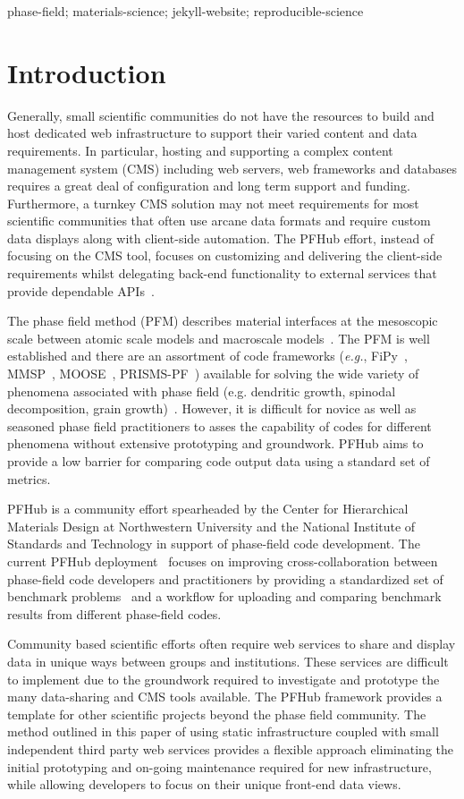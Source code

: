 \documentclass{jors}
\begin{document}
phase-field; materials-science; jekyll-website; reproducible-science

\section*{Introduction}

Generally, small scientific communities do not have the resources to
build and host dedicated web infrastructure to support their varied
content and data requirements. In particular, hosting and supporting a
complex content management system (CMS) including web servers, web
frameworks and databases requires a great deal of configuration and
long term support and funding. Furthermore, a turnkey CMS solution may
not meet requirements for most scientific communities that often use
arcane data formats and require custom data displays along with
client-side automation. The PFHub effort, instead of focusing on the
CMS tool, focuses on customizing and delivering the client-side
requirements whilst delegating back-end functionality to external
services that provide dependable APIs~\cite{cmsfree}.

The phase field method (PFM) describes material interfaces at the
mesoscopic scale between atomic scale models and macroscale
models~\cite{MOELANS2008268}. The PFM is well established and there
are an assortment of code frameworks (\emph{e.g.}, FiPy~\cite{fipy},
MMSP~\cite{mmsp}, MOOSE~\cite{moose}, PRISMS-PF~\cite{prisms-pf})
available for solving the wide variety of phenomena associated with
phase field (e.g. dendritic growth, spinodal decomposition, grain
growth)~\cite{tonks}. However, it is difficult for novice as well as
seasoned phase field practitioners to asses the capability of codes
for different phenomena without extensive prototyping and
groundwork. PFHub aims to provide a low barrier for comparing code
output data using a standard set of metrics.

PFHub is a community effort spearheaded by the Center for Hierarchical
Materials Design at Northwestern University and the National Institute
of Standards and Technology in support of phase-field code
development. The current PFHub deployment~\cite{pfhub} focuses on
improving cross-collaboration between phase-field code developers and
practitioners by providing a standardized set of benchmark
problems~\cite{bm1, bm2} and a workflow for uploading and comparing
benchmark results from different phase-field codes.

Community based scientific efforts often require web services to share
and display data in unique ways between groups and institutions. These
services are difficult to implement due to the groundwork required to
investigate and prototype the many data-sharing and CMS tools
available. The PFHub framework provides a template for other
scientific projects beyond the phase field community. The method
outlined in this paper of using static infrastructure coupled with
small independent third party web services provides a flexible
approach eliminating the initial prototyping and on-going maintenance
required for new infrastructure, while allowing developers to focus on
their unique front-end data views.
\end{document}
